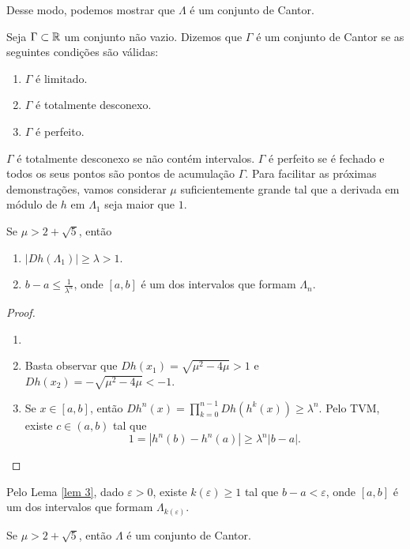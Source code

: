 Desse modo, podemos mostrar que $\Lambda$ é um conjunto de Cantor.

\begin{definition}
Seja $\Gamma \subset \mathbb{R}$ um conjunto não vazio. Dizemos que $\Gamma$ é um conjunto de Cantor se as seguintes condições são válidas:
\begin{enumerate}[label=\roman*.]
\item $\Gamma$ é limitado.
\item $\Gamma$ é totalmente desconexo.
\item $\Gamma$ é perfeito.
\end{enumerate}
\end{definition}

$\Gamma$ é totalmente desconexo se não contém intervalos. $\Gamma$ é perfeito se é fechado e todos os seus pontos são pontos de acumulação $\Gamma$. Para facilitar as próximas demonstrações, vamos considerar $\mu$ suficientemente grande tal que a derivada em módulo de $h$ em $\Lambda_1$ seja maior que $1$.

\begin{lemma}\label{lem 3}
Se $\mu > 2 + \sqrt{5}$, então
\begin{enumerate}
\item  $|D h(\Lambda_1)| \geq \lambda > 1$.
\item $b - a \leq \frac{1}{\lambda^n}$, onde $[a, b]$ é um dos intervalos que formam $\Lambda_n$.
\end{enumerate}
\end{lemma}

\begin{proof}
\begin{enumerate}\item[]
\item Basta observar que $D h(x_1) = \sqrt{\mu^2 - 4\mu} > 1$ e $D h(x_2) = -\sqrt{\mu^2 - 4\mu} < -1$.
\item Se $x \in [a, b]$, então $D h^n(x) = \prod_{k=0}^{n-1} D h(h^k(x)) \geq \lambda^n$. Pelo TVM, existe $c \in (a, b)$ tal que
$$1 = |h^n(b) - h^n(a)| \geq \lambda^n|b - a|.$$
\end{enumerate}
\end{proof} 

Pelo Lema \ref{lem 3}, dado $\varepsilon > 0$, existe $k(\varepsilon) \geq 1$ tal que $b - a < \varepsilon$, onde $[a, b]$ é um dos intervalos que formam $\Lambda_{k(\varepsilon)}$.

\begin{theorem}\label{teo 3-1}
Se $\mu > 2 + \sqrt{5}$, então $\Lambda$ é um conjunto de Cantor.
\end{theorem}

